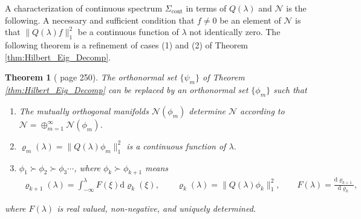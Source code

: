 \documentclass[11pt]{amsart}
\renewcommand{\d}{\mathrm{d}}
\newcommand{\Sigc}{\Sigma_{\text{cont}}}
\newcommand{\Nc}{\mathcal{N}}
\newtheorem{theorem}{Theorem}[section]
\begin{document}
A characterization of continuous spectrum $\Sigc$ in terms of $Q(\lambda)$
and $\Nc$ is the following. A necessary and sufficient condition that
$f\neq0$ be an element of $\Nc$ is that $\|Q(\lambda)f\|_1^2$ be a continuous
function of $\lambda$ not identically zero. The following theorem is a
refinement of cases (1) and (2) of Theorem
\ref{thm:Hilbert_Eig_Decomp}.
%
\begin{theorem}[\cite{Stone:64} page 250]
\label{thm:Cont_Spec}  
The orthonormal set $\{\psi_m\}$ of Theorem \ref{thm:Hilbert_Eig_Decomp}
can be replaced by an orthonormal set $\{\phi_m\}$ such that
%
\begin{enumerate}
\item The mutually orthogonal manifolds $\Nc(\phi_m)$ determine $\Nc$
  according to $\Nc=\oplus_{m=1}^\infty\Nc(\phi_m)$. 
\item $\varrho_m(\lambda)=\|Q(\lambda)\phi_m\|_1^2$ is a continuous function of $\lambda$.
\item $\phi_1\succ\phi_2\succ\phi_3\cdots$, where $\phi_k\succ\phi_{k+1}$ means
%
\begin{align}
  \varrho_{k+1}(\lambda)=\int_{-\infty}^\lambda F(\xi)\d\varrho_k(\xi), \qquad
  \varrho_k(\lambda)=\|Q(\lambda)\phi_k\|_1^2, \qquad
  F(\lambda)=\frac{\d\varrho_{k+1}}{\d\varrho_k},
\end{align}
%
\end{enumerate}
%
where $F(\lambda)$ is real valued, non-negative, and uniquely determined.
\end{theorem}
%
\end{document}
